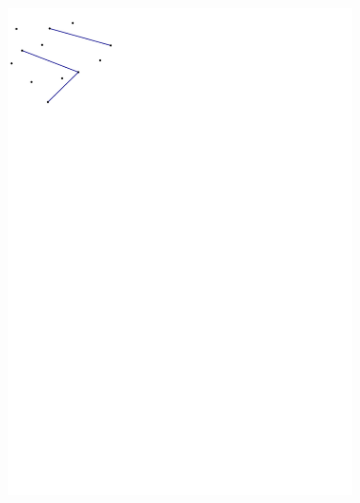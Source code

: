 \begin{enumerate}
\begin{figure}[h]
\begin{subfigure}[b]{0.4\linewidth}
    \includegraphics[width=\textwidth]{figs/cdt_exercise.pdf}
  \end{subfigure}
  \end{figure}
\end{enumerate}